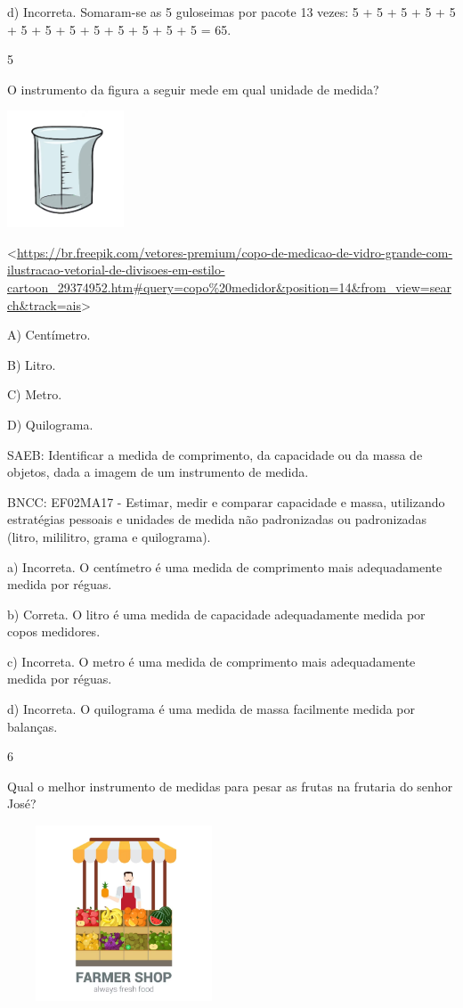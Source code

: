 \begin{escolha}
\begin{escolha}
{{{{d) Incorreta. Somaram-se as 5 guloseimas por pacote 13 vezes: 5 + 5 + 5 + 5 +
5 + 5 + 5 + 5 + 5 + 5 + 5 + 5 + 5 = 65.

\num{5}

O instrumento da figura a seguir mede em qual unidade de medida?

\includegraphics[width=1.36285in,height=1.36285in]{media/image165.png}

\textless{}\url{https://br.freepik.com/vetores-premium/copo-de-medicao-de-vidro-grande-com-ilustracao-vetorial-de-divisoes-em-estilo-cartoon_29374952.htm\#query=copo\%20medidor\&position=14\&from_view=search\&track=ais}\textgreater{}

A) Centímetro.

B) Litro.

C) Metro.

D) Quilograma.

SAEB: Identificar a medida de comprimento, da capacidade ou da
massa de objetos, dada a imagem de um instrumento de medida.

BNCC: EF02MA17 - Estimar, medir e comparar capacidade
e massa, utilizando estratégias pessoais e unidades de medida não
padronizadas ou padronizadas (litro, mililitro, grama e quilograma).

a) Incorreta. O centímetro é uma medida de comprimento mais adequadamente medida por réguas.

b) Correta. O litro é uma medida de capacidade adequadamente medida por copos medidores.

c) Incorreta. O metro é uma medida de comprimento mais adequadamente medida por réguas.

d) Incorreta. O quilograma é uma medida de massa facilmente medida por balanças.

\num{6}

Qual o melhor instrumento de medidas para pesar as frutas na frutaria do
senhor José?

\includegraphics[width=2.72569in,height=2.04904in]{media/image166.png}

}}}}
\end{escolha}
\end{escolha}
